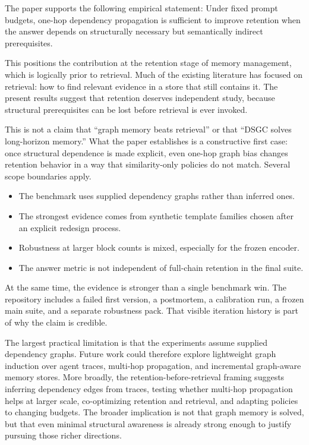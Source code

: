 \documentclass[10pt]{article}
\begin{document}
The paper supports the following empirical statement:
Under fixed prompt budgets, one-hop dependency propagation is sufficient to improve retention when the answer depends on structurally necessary but semantically indirect prerequisites.

This positions the contribution at the retention stage of memory management, which is logically prior to retrieval. Much of the existing literature has focused on retrieval: how to find relevant evidence in a store that still contains it. The present results suggest that retention deserves independent study, because structural prerequisites can be lost before retrieval is ever invoked.

This is not a claim that ``graph memory beats retrieval'' or that ``DSGC solves long-horizon memory.'' What the paper establishes is a constructive first case: once structural dependence is made explicit, even one-hop graph bias changes retention behavior in a way that similarity-only policies do not match. Several scope boundaries apply.

\begin{itemize}[leftmargin=1.3em]
  \item The benchmark uses supplied dependency graphs rather than inferred ones.
  \item The strongest evidence comes from synthetic template families chosen after an explicit redesign process.
  \item Robustness at larger block counts is mixed, especially for the frozen encoder.
  \item The answer metric is not independent of full-chain retention in the final suite.
\end{itemize}

At the same time, the evidence is stronger than a single benchmark win. The repository includes a failed first version, a postmortem, a calibration run, a frozen main suite, and a separate robustness pack. That visible iteration history is part of why the claim is credible.

The largest practical limitation is that the experiments assume supplied dependency graphs. Future work could therefore explore lightweight graph induction over agent traces, multi-hop propagation, and incremental graph-aware memory stores. More broadly, the retention-before-retrieval framing suggests inferring dependency edges from traces, testing whether multi-hop propagation helps at larger scale, co-optimizing retention and retrieval, and adapting policies to changing budgets. The broader implication is not that graph memory is solved, but that even minimal structural awareness is already strong enough to justify pursuing those richer directions.
\end{document}
